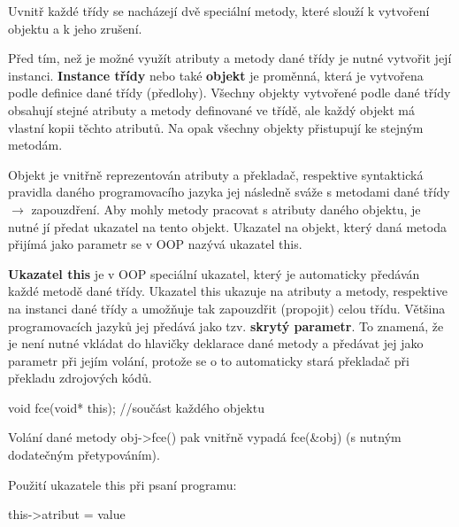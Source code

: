 



Uvnitř každé třídy se nacházejí dvě speciální metody, které slouží k vytvoření objektu a k jeho zrušení. 






Před tím, než je možné využít atributy a metody dané třídy je nutné vytvořit její instanci. {\bf Instance třídy} nebo také {\bf objekt} je proměnná, která je vytvořena podle definice dané třídy (předlohy). Všechny objekty vytvořené podle dané třídy obsahují stejné atributy a metody definované ve třídě, ale každý objekt má vlastní kopii těchto atributů. Na opak všechny objekty přistupují ke stejným metodám.




Objekt je vnitřně reprezentován atributy a překladač, respektive syntaktická pravidla daného programovacího jazyka jej následně sváže s metodami dané třídy $\rightarrow$ zapouzdření. Aby mohly metody pracovat s atributy daného objektu, je nutné jí předat ukazatel na tento objekt. Ukazatel na objekt, který daná metoda přijímá jako parametr se v OOP nazývá ukazatel this.

{\bf Ukazatel this} je v OOP speciální ukazatel, který je automaticky předáván každé metodě dané třídy. Ukazatel this ukazuje na atributy a metody, respektive na instanci dané třídy a umožňuje tak zapouzdřit (propojit) celou třídu. Většina programovacích jazyků jej předává jako tzv. {\bf skrytý parametr}. To znamená, že je není nutné vkládat do hlavičky deklarace dané metody a předávat jej jako parametr při jejím volání, protože se o to automaticky stará překladač při překladu zdrojových kódů.

\vskip 4mm
{
\verbatim 
\odradkovat
void fce(void* this); //součást každého objektu
}
\vskip 4mm

\noindent Volání dané metody {\verbatim obj->fce()} pak vnitřně vypadá {\verbatim fce(\&obj)} (s nutným dodatečným přetypováním). 

Použití ukazatele this při psaní programu:

\vskip 4mm
{
\verbatim 
\odradkovat
this->atribut = value
}
\vskip 4mm

